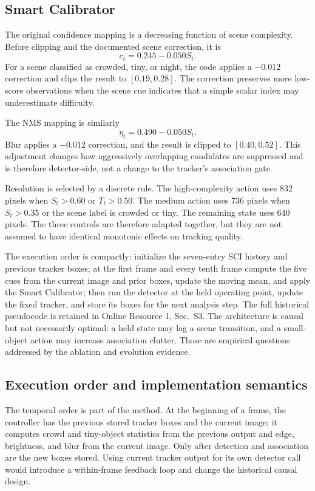\subsection{Smart Calibrator}
The original confidence mapping is a decreasing function of scene complexity. Before clipping and the documented scene correction, it is
\begin{equation}
c_t=0.245-0.050S_t.
\end{equation}
For a scene classified as crowded, tiny, or night, the code applies a $-0.012$ correction and clips the result to $[0.19,0.28]$. The correction preserves more low-score observations when the scene cue indicates that a simple scalar index may underestimate difficulty.

The NMS mapping is similarly
\begin{equation}
\eta_t=0.490-0.050S_t.
\end{equation}
Blur applies a $-0.012$ correction, and the result is clipped to $[0.40,0.52]$. This adjustment changes how aggressively overlapping candidates are suppressed and is therefore detector-side, not a change to the tracker's association gate.

Resolution is selected by a discrete rule. The high-complexity action uses 832 pixels when $S_t>0.60$ or $T_t>0.50$. The medium action uses 736 pixels when $S_t>0.35$ or the scene label is crowded or tiny. The remaining state uses 640 pixels. The three controls are therefore adapted together, but they are not assumed to have identical monotonic effects on tracking quality.

The execution order is compactly: initialize the seven-entry SCI history and
previous tracker boxes; at the first frame and every tenth frame compute the
five cues from the current image and prior boxes, update the moving mean, and
apply the Smart Calibrator; then run the detector at the held operating point,
update the fixed tracker, and store its boxes for the next analysis step. The
full historical pseudocode is retained in Online Resource 1, Sec.~S3.
The architecture is causal but not necessarily optimal: a held state may lag a
scene transition, and a small-object action may increase association clutter.
Those are empirical questions addressed by the ablation and evolution evidence.

\subsection{Execution order and implementation semantics}
The temporal order is part of the method. At the beginning of a frame, the
controller has the previous stored tracker boxes and the current image; it
computes crowd and tiny-object statistics from the previous output and edge,
brightness, and blur from the current image. Only after detection and
association are the new boxes stored. Using current tracker output for its own
detector call would introduce a within-frame feedback loop and change the
historical causal design.

